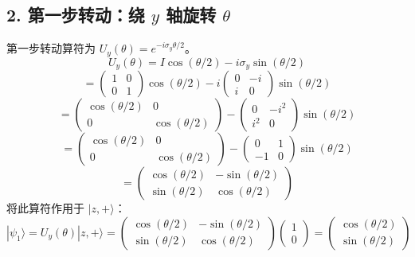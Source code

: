 \documentclass{article}
\begin{document}
\subsection*{2. 第一步转动：绕 \(y\) 轴旋转 \(\theta\)}
第一步转动算符为 \(U_y(\theta) = e^{-i\sigma_y \theta/2}\)。
\[ U_y(\theta) = I \cos(\theta/2) - i\sigma_y \sin(\theta/2) \]
\[ = \begin{pmatrix} 1 & 0 \\ 0 & 1 \end{pmatrix} \cos(\theta/2) - i \begin{pmatrix} 0 & -i \\ i & 0 \end{pmatrix} \sin(\theta/2) \]
\[ = \begin{pmatrix} \cos(\theta/2) & 0 \\ 0 & \cos(\theta/2) \end{pmatrix} - \begin{pmatrix} 0 & -i^2 \\ i^2 & 0 \end{pmatrix} \sin(\theta/2) \]
\[ = \begin{pmatrix} \cos(\theta/2) & 0 \\ 0 & \cos(\theta/2) \end{pmatrix} - \begin{pmatrix} 0 & 1 \\ -1 & 0 \end{pmatrix} \sin(\theta/2) \]
\[ = \begin{pmatrix} \cos(\theta/2) & -\sin(\theta/2) \\ \sin(\theta/2) & \cos(\theta/2) \end{pmatrix} \]
将此算符作用于 \(|z,+\rangle\)：
\[ |\psi_1\rangle = U_y(\theta) |z,+\rangle = \begin{pmatrix} \cos(\theta/2) & -\sin(\theta/2) \\ \sin(\theta/2) & \cos(\theta/2) \end{pmatrix} \begin{pmatrix} 1 \\ 0 \end{pmatrix} = \begin{pmatrix} \cos(\theta/2) \\ \sin(\theta/2) \end{pmatrix} \]
\end{document}
